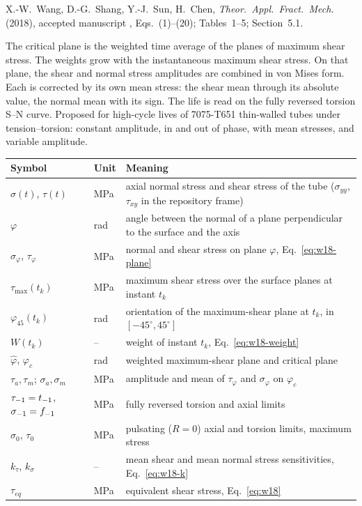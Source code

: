 \label{sheet:WANG2018}

 X.-W.~Wang, D.-G.~Shang, Y.-J.~Sun, H.~Chen, \emph{Theor.\ Appl.\ Fract.\ Mech.}
(2018), accepted manuscript \cite{wang2018}, Eqs.~(1)--(20); Tables~1--5; Section~5.1.

 The critical plane is the weighted time average of the planes of maximum
shear stress. The weights grow with the instantaneous maximum shear stress. On that plane, the
shear and normal stress amplitudes are combined in von Mises form. Each is corrected by its own
mean stress: the shear mean through its absolute value, the normal mean with its sign. The life is
read on the fully reversed torsion S--N curve. Proposed for high-cycle lives of 7075-T651
thin-walled tubes under tension--torsion: constant amplitude, in and out of phase, with mean
stresses, and variable amplitude.

\begin{center}\small
\begin{tabular}{@{}llp{100mm}@{}}
\toprule
Symbol & Unit & Meaning\\\midrule
$\sigma(t)$, $\tau(t)$ & MPa & axial normal stress and shear stress of the tube ($\sigma_{yy}$, $\tau_{xy}$ in the repository frame)\\
$\varphi$ & rad & angle between the normal of a plane perpendicular to the surface and the axis\\
$\sigma_\varphi$, $\tau_\varphi$ & MPa & normal and shear stress on plane $\varphi$, Eq.~\eqref{eq:w18-plane}\\
$\tau_{\max}(t_k)$ & MPa & maximum shear stress over the surface planes at instant $t_k$\\
$\varphi_{45}(t_k)$ & rad & orientation of the maximum-shear plane at $t_k$, in $[-45^\circ,45^\circ]$\\
$W(t_k)$ & -- & weight of instant $t_k$, Eq.~\eqref{eq:w18-weight}\\
$\hat\varphi$, $\varphi_c$ & rad & weighted maximum-shear plane and critical plane\\
$\tau_a,\tau_m$; $\sigma_a,\sigma_m$ & MPa & amplitude and mean of $\tau_\varphi$ and $\sigma_\varphi$ on $\varphi_c$\\
$\tau_{-1}=t_{-1}$, $\sigma_{-1}=f_{-1}$ & MPa & fully reversed torsion and axial limits\\
$\sigma_0$, $\tau_0$ & MPa & pulsating ($R=0$) axial and torsion limits, maximum stress\\
$k_\tau$, $k_\sigma$ & -- & mean shear and mean normal stress sensitivities, Eq.~\eqref{eq:w18-k}\\
$\tau_{eq}$ & MPa & equivalent shear stress, Eq.~\eqref{eq:w18}\\
\bottomrule
\end{tabular}
\end{center}

